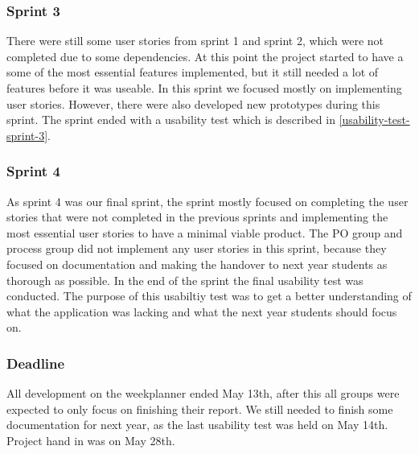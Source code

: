 \subsubsection{Sprint 3}
There were still some  user stories from sprint 1 and sprint 2, which were not completed due to some dependencies. 
At this point the project started to have a some of the most essential features implemented, but it still needed a lot of features before it was useable. 
In this sprint we focused mostly on implementing user stories.
However, there were also developed new prototypes during this sprint. 
The sprint ended with a usability test which is described in \autoref{usability-test-sprint-3}.

\subsubsection{Sprint 4}
As sprint 4 was our final sprint, the sprint mostly focused on completing the user stories that were not completed in the previous sprints and implementing the most essential user stories to have a minimal viable product.
The PO group and process group did not implement any user stories in this sprint, because they focused on documentation and making the handover to next year students as thorough as possible.
In the end of the sprint the final usability test was conducted.
The purpose of this usabiltiy test was to get a better understanding of what the application was lacking and what the next year students should focus on.

\subsubsection{Deadline}
All development on the weekplanner ended May 13th, after this all groups were expected to only focus on finishing their report.
We still needed to finish some documentation for next year, as the last usability test was held on May 14th.
Project hand in was on May 28th.
